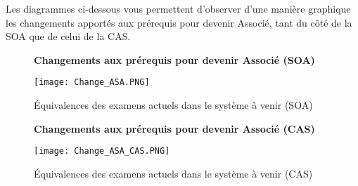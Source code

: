 Les diagrammes ci-dessous vous permettent d'observer d'une manière graphique les changements apportés aux prérequis pour devenir Associé, tant du côté de la SOA que de celui de la CAS.

\begin{figure}[hp]
\begin{center}
\textbf{Changements aux prérequis pour devenir Associé (SOA)}\par\medskip
\end{center}
\hfill\texttt{[image: Change\_ASA.PNG]}\hspace*{\fill}
\caption{Équivalences des examens actuels dans le système à venir (SOA)}
\end{figure}
\par
\begin{figure}[hp]
\begin{center}
\textbf{Changements aux prérequis pour devenir Associé (CAS)}\par\medskip
\end{center}
\hfill\texttt{[image: Change\_ASA\_CAS.PNG]}\hspace*{\fill}
\caption{Équivalences des examens actuels dans le système à venir (CAS)}
\end{figure}
\par

\newpage